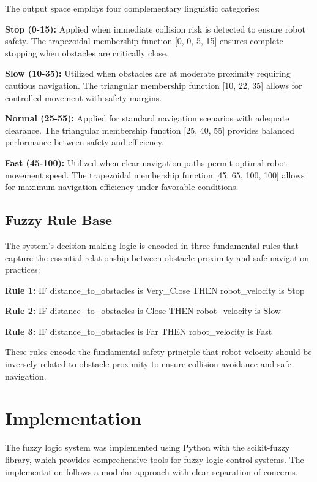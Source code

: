 \documentclass[11pt,a4paper]{article}
\begin{document}
The output space employs four complementary linguistic categories:

\textbf{Stop (0-15):} Applied when immediate collision risk is detected to ensure robot safety. The trapezoidal membership function [0, 0, 5, 15] ensures complete stopping when obstacles are critically close.

\textbf{Slow (10-35):} Utilized when obstacles are at moderate proximity requiring cautious navigation. The triangular membership function [10, 22, 35] allows for controlled movement with safety margins.

\textbf{Normal (25-55):} Applied for standard navigation scenarios with adequate clearance. The triangular membership function [25, 40, 55] provides balanced performance between safety and efficiency.

\textbf{Fast (45-100):} Utilized when clear navigation paths permit optimal robot movement speed. The trapezoidal membership function [45, 65, 100, 100] allows for maximum navigation efficiency under favorable conditions.

\subsection{Fuzzy Rule Base}

The system's decision-making logic is encoded in three fundamental rules that capture the essential relationship between obstacle proximity and safe navigation practices:

\textbf{Rule 1:} IF distance\_to\_obstacles is Very\_Close THEN robot\_velocity is Stop

\textbf{Rule 2:} IF distance\_to\_obstacles is Close THEN robot\_velocity is Slow

\textbf{Rule 3:} IF distance\_to\_obstacles is Far THEN robot\_velocity is Fast

These rules encode the fundamental safety principle that robot velocity should be inversely related to obstacle proximity to ensure collision avoidance and safe navigation.

\section{Implementation}

The fuzzy logic system was implemented using Python with the scikit-fuzzy library, which provides comprehensive tools for fuzzy logic control systems. The implementation follows a modular approach with clear separation of concerns.
\end{document}
